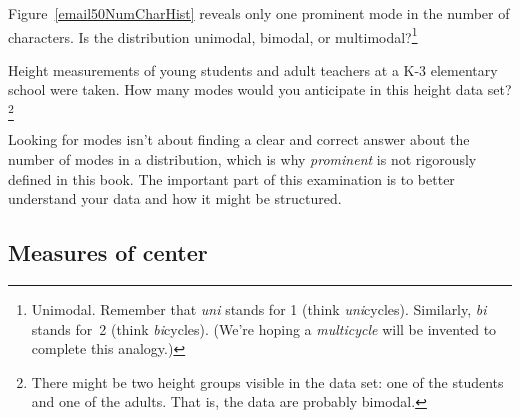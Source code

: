 \begin{exercise}
Figure~\ref{email50NumCharHist} reveals only one prominent mode in the number of characters. Is the distribution unimodal, bimodal, or multimodal?\footnote{Unimodal. Remember that \emph{uni} stands for 1 (think \emph{uni}cycles). Similarly, \emph{bi} stands for~2 (think \emph{bi}cycles). (We're hoping a \emph{multicycle} will be invented to complete this analogy.)}
\end{exercise}

\begin{exercise}
Height measurements of young students and adult teachers at a K-3 elementary school were taken. How many modes would you anticipate in this height data set?\footnote{There might be two height groups visible in the data set: one of the students and one of the adults. That is, the data are probably bimodal.}
\end{exercise}

\begin{tipBox}{
Looking for modes isn't about finding a clear and correct answer about the number of modes in a distribution, which is why \emph{prominent} is not rigorously defined in this book. The important part of this examination is to better understand your data and how it might be structured.}
\end{tipBox}


\subsection{Measures of center}
\label{center}



